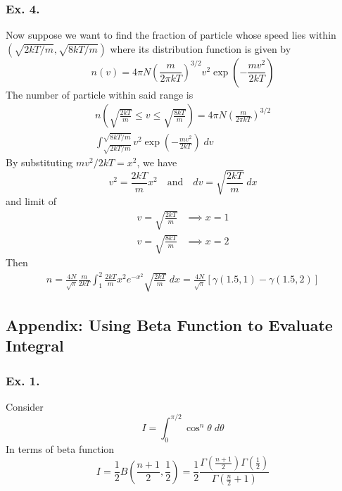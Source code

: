 \documentclass[../../main.tex]{subfiles}
\begin{document}
\subsubsection*{Ex. 4.} Now suppose we want to find the fraction of particle whose speed lies within $(\sqrt{2kT/m}, \sqrt{8kT/m})$ where its distribution function is given by 
\begin{equation*}
    n(v)=4\pi N\left(\frac{m}{2\pi kT}\right)^{3/2}v^2\exp\left(-\frac{mv^2}{2kT}\right)
\end{equation*}
The number of particle within said range is 
\begin{multline*}
    n\left(\sqrt{\frac{2kT}{m}}\leq v\leq \sqrt{\frac{8kT}{m}}\right)=4\pi N\left(\frac{m}{2\pi kT}\right)^{3/2}\\
    \int_{\sqrt{2kT/m}}^{\sqrt{8kT/m}}v^2\exp\left(-\frac{mv^2}{2kT}\right)\;dv
\end{multline*}
By substituting $mv^2/2kT=x^2$, we have 
\begin{equation*}
    v^2=\frac{2kT}{m}x^2\quad\text{and}\quad dv=\sqrt{\frac{2kT}{m}}\;dx
\end{equation*}
and limit of 
\begin{align*}
    v=\sqrt{\frac{2kT}{m}}&\implies x=1\\
    v=\sqrt{\frac{8kT}{m}}&\implies x=2
\end{align*}
Then 
\begin{align*}
    n=\frac{4N}{\sqrt{\pi}}\frac{m}{2kT}\int_{1}^{2}\frac{2kT}{m}x^2 e^{-x^2} \sqrt{\frac{ 2kT}{m }}\;dx=\frac{4N}{\sqrt{\pi}}\left[\gamma(1.5,1)-\gamma(1.5,2)\right]
\end{align*}

\subsection*{Appendix: Using Beta Function to Evaluate Integral}
\subsubsection*{Ex. 1.} Consider
\begin{equation*}
    I=\int_{0}^{\pi/2}\cos^n\theta\;d\theta
\end{equation*}
In terms of beta function
\begin{equation*}
    I=\frac{1}{2}B\left(\frac{n+1}{2},\frac{1}{2}\right)=\frac{1}{2}\frac{\Gamma\left(\frac{n+1}{2}\right)\Gamma\left(\frac{1}{2}\right)}{\Gamma\left(\frac{n}{2}+1\right)}
\end{equation*}
\end{document}
